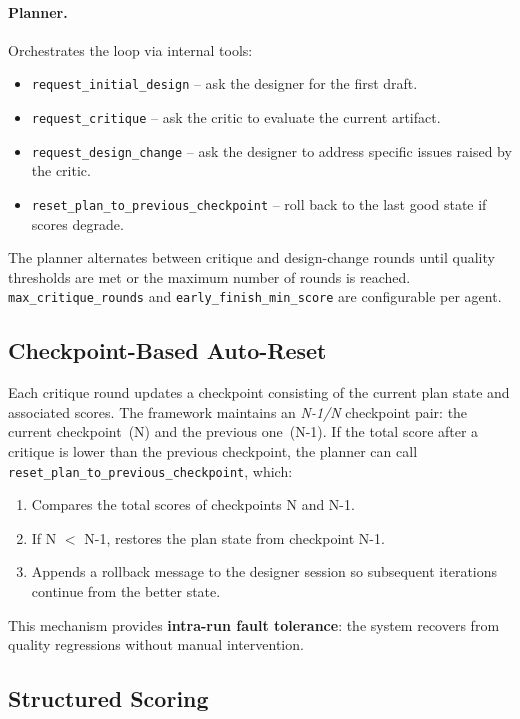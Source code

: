 \documentclass[11pt, a4paper]{article}
\begin{document}
\paragraph{Planner.}
Orchestrates the loop via internal tools:
\begin{itemize}[leftmargin=*]
  \item \texttt{request\_initial\_design} -- ask the designer for the
    first draft.
  \item \texttt{request\_critique} -- ask the critic to evaluate the
    current artifact.
  \item \texttt{request\_design\_change} -- ask the designer to address
    specific issues raised by the critic.
  \item \texttt{reset\_plan\_to\_previous\_checkpoint} -- roll back to
    the last good state if scores degrade.
\end{itemize}

The planner alternates between critique and design-change rounds until
quality thresholds are met or the maximum number of rounds is reached.
\texttt{max\_critique\_rounds} and \texttt{early\_finish\_min\_score}
are configurable per agent.

\subsection{Checkpoint-Based Auto-Reset}
\label{sec:checkpoint}

Each critique round updates a checkpoint consisting of the current
plan state and associated scores.  The framework maintains an
\emph{N-1/N} checkpoint pair: the current checkpoint~(N) and the
previous one~(N-1).  If the total score after a critique is lower than
the previous checkpoint, the planner can call
\texttt{reset\_plan\_to\_previous\_checkpoint}, which:
\begin{enumerate}[leftmargin=*]
  \item Compares the total scores of checkpoints N and N-1.
  \item If N $<$ N-1, restores the plan state from checkpoint N-1.
  \item Appends a rollback message to the designer session so subsequent
    iterations continue from the better state.
\end{enumerate}
This mechanism provides \textbf{intra-run fault tolerance}: the system
recovers from quality regressions without manual intervention.

\subsection{Structured Scoring}
\label{sec:scoring}
\end{document}
